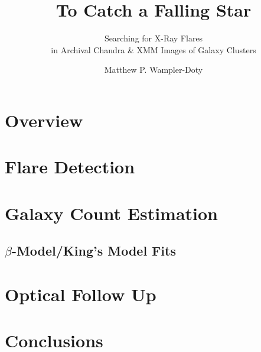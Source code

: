 \usepackage{graphicx}
\usepackage{hyperref}
\usepackage{marvosym}
\usepackage{movie15}
\title{To Catch a Falling Star}
\subtitle{Searching for X-Ray Flares \\ 
in Archival Chandra \& XMM Images of Galaxy Clusters}
\author{Matthew P. Wampler-Doty}
\date{}

\maketitle
{}
\section{Overview}

\section{Flare Detection}

\section{Galaxy Count Estimation}
\subsection{$\beta$-Model/King's Model Fits}
\section{Optical Follow Up}
\section{Conclusions}

